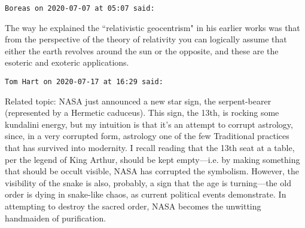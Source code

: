 \begin{footnotesize}
\begin{sffamily}
\hfill

\texttt{Boreas on 2020-07-07 at 05:07 said: }

The way he explained the ``relativistic geocentrism" in his earlier works was that from the perspective of the theory of relativity you can logically assume that either the earth revolves around the sun or the opposite, and these are the esoteric and exoteric applications.


\hfill

\texttt{Tom Hart on 2020-07-17 at 16:29 said: }

Related topic: NASA just announced a new star sign, the serpent-bearer (represented by a Hermetic caduceus). This sign, the 13th, is rocking some kundalini energy, but my intuition is that it's an attempt to corrupt astrology, since, in a very corrupted form, astrology one of the few Traditional practices that has survived into modernity. I recall reading that the 13th seat at a table, per the legend of King Arthur, should be kept empty—i.e. by making something that should be occult visible, NASA has corrupted the symbolism. However, the visibility of the snake is also, probably, a sign that the age is turning—the old order is dying in snake-like chaos, as current political events demonstrate. In attempting to destroy the sacred order, NASA becomes the unwitting handmaiden of purification.


\end{sffamily}\end{footnotesize}
